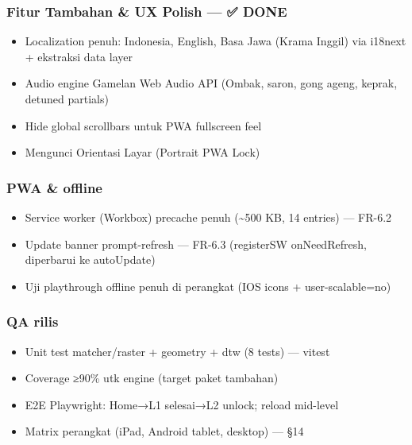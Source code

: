 \documentclass[
  11pt,
]{article}
\providecommand{\tightlist}{%
  \setlength{\itemsep}{0pt}\setlength{\parskip}{0pt}}
\begin{document}
\subsubsection{Fitur Tambahan \& UX Polish --- ✅
DONE}\label{fitur-tambahan-ux-polish-done}

\begin{itemize}
\tightlist
\item[$\boxtimes$]
  Localization penuh: Indonesia, English, Basa Jawa (Krama Inggil) via
  i18next + ekstraksi data layer
\item[$\boxtimes$]
  Audio engine Gamelan Web Audio API (Ombak, saron, gong ageng, keprak,
  detuned partials)
\item[$\boxtimes$]
  Hide global scrollbars untuk PWA fullscreen feel
\item[$\boxtimes$]
  Mengunci Orientasi Layar (Portrait PWA Lock)
\end{itemize}

\subsubsection{PWA \& offline}\label{pwa-offline}

\begin{itemize}
\tightlist
\item[$\boxtimes$]
  Service worker (Workbox) precache penuh (\textasciitilde500 KB, 14
  entries) --- FR-6.2
\item[$\boxtimes$]
  Update banner prompt-refresh --- FR-6.3 (registerSW onNeedRefresh,
  diperbarui ke autoUpdate)
\item[$\boxtimes$]
  Uji playthrough offline penuh di perangkat (IOS icons +
  user-scalable=no)
\end{itemize}

\subsubsection{QA rilis}\label{qa-rilis}

\begin{itemize}
\tightlist
\item[$\boxtimes$]
  Unit test matcher/raster + geometry + dtw (8 tests) --- vitest
\item[$\square$]
  Coverage ≥90\% utk engine (target paket tambahan)
\item[$\square$]
  E2E Playwright: Home→L1 selesai→L2 unlock; reload mid-level
\item[$\square$]
  Matrix perangkat (iPad, Android tablet, desktop) --- §14
\end{itemize}
\end{document}
